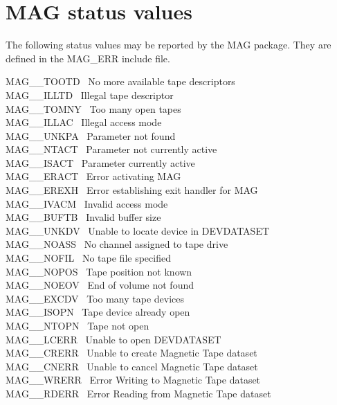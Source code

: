 \newpage
\section{\label{mag_errors}MAG status values}

The following status values may be reported by the MAG package. They are
defined in the MAG\_ERR include file.

MAG\_\_TOOTD  \dash\ No more available tape descriptors \\
MAG\_\_ILLTD  \dash\ Illegal tape descriptor \\
MAG\_\_TOMNY  \dash\ Too many open tapes \\
MAG\_\_ILLAC  \dash\ Illegal access mode \\
MAG\_\_UNKPA  \dash\ Parameter not found \\
MAG\_\_NTACT  \dash\ Parameter not currently active \\
MAG\_\_ISACT  \dash\ Parameter currently active \\
MAG\_\_ERACT  \dash\ Error activating MAG \\
MAG\_\_EREXH  \dash\ Error establishing exit handler for MAG \\
MAG\_\_IVACM  \dash\ Invalid access mode \\
MAG\_\_BUFTB  \dash\ Invalid buffer size \\
MAG\_\_UNKDV  \dash\ Unable to locate device in DEVDATASET \\
MAG\_\_NOASS  \dash\ No channel assigned to tape drive \\
MAG\_\_NOFIL  \dash\ No tape file specified \\
MAG\_\_NOPOS  \dash\ Tape position not known \\
MAG\_\_NOEOV  \dash\ End of volume not found \\
MAG\_\_EXCDV  \dash\ Too many tape devices \\
MAG\_\_ISOPN  \dash\ Tape device already open \\
MAG\_\_NTOPN  \dash\ Tape not open \\
MAG\_\_LCERR  \dash\ Unable to open DEVDATASET \\
MAG\_\_CRERR  \dash\ Unable to create Magnetic Tape dataset \\
MAG\_\_CNERR  \dash\ Unable to cancel Magnetic Tape dataset \\
MAG\_\_WRERR  \dash\ Error Writing to Magnetic Tape dataset \\
MAG\_\_RDERR  \dash\ Error Reading from Magnetic Tape dataset \\
